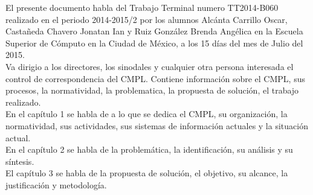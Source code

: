 El presente documento habla del Trabajo Terminal numero TT2014-B060 realizado en el periodo 2014-2015/2 por los alumnos Alcánta Carrillo Oscar, Castañeda Chavero Jonatan Ian y Ruiz González Brenda Angélica en la Escuela Superior de Cómputo en la Ciudad de México, a los 15 días del mes de Julio del 2015.\\ Va dirigio a los directores, los sinodales y cualquier otra persona interesada el control de correspondencia del CMPL. Contiene información sobre el CMPL, sus procesos, la normatividad, la problematica, la propuesta de solución, el trabajo realizado. \\
En el capítulo 1 se habla de a lo que se dedica el CMPL, su organización, la normatividad, sus actividades, sus sistemas de información actuales y la situación actual.\\
En el capítulo 2 se habla de la problemática, la identificación, su análisis y su síntesis. \\
El capítulo 3 se habla de la propuesta de solución, el objetivo, su alcance, la justificación y metodología.\\